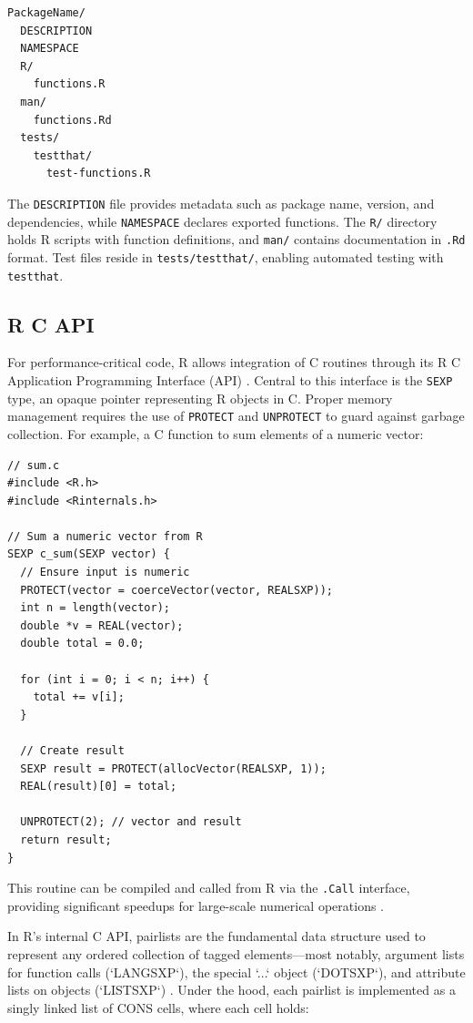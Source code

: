 \begin{verbatim}
PackageName/
  DESCRIPTION
  NAMESPACE
  R/
    functions.R
  man/
    functions.Rd
  tests/
    testthat/
      test-functions.R
\end{verbatim}

The \texttt{DESCRIPTION} file provides metadata such as package name, version, and dependencies, while \texttt{NAMESPACE} declares exported functions. The \texttt{R/} directory holds R scripts with function definitions, and \texttt{man/} contains documentation in \texttt{.Rd} format. Test files reside in \texttt{tests/testthat/}, enabling automated testing with \texttt{testthat}.

\subsection{R C API}

For performance-critical code, R allows integration of C routines through its R C Application Programming Interface (API) \cite{R-base}. Central to this interface is the \texttt{SEXP} type, an opaque pointer representing R objects in C. Proper memory management requires the use of \texttt{PROTECT} and \texttt{UNPROTECT} to guard against garbage collection. For example, a C function to sum elements of a numeric vector:

\begin{verbatim}
// sum.c
#include <R.h>
#include <Rinternals.h>

// Sum a numeric vector from R
SEXP c_sum(SEXP vector) {
  // Ensure input is numeric
  PROTECT(vector = coerceVector(vector, REALSXP));
  int n = length(vector);
  double *v = REAL(vector);
  double total = 0.0;

  for (int i = 0; i < n; i++) {
    total += v[i];
  }

  // Create result
  SEXP result = PROTECT(allocVector(REALSXP, 1));
  REAL(result)[0] = total;

  UNPROTECT(2); // vector and result
  return result;
}
\end{verbatim}

This routine can be compiled and called from R via the \texttt{.Call} interface, providing significant speedups for large-scale numerical operations \cite{R-base}.

In R’s internal C API, pairlists are the fundamental data structure used to represent any ordered collection of tagged elements—most notably, argument lists for function calls (`LANGSXP`), the special `...` object (`DOTSXP`), and attribute lists on objects (`LISTSXP`) \cite{wickham_pairlists}.  Under the hood, each pairlist is implemented as a singly linked list of CONS cells, where each cell holds:

